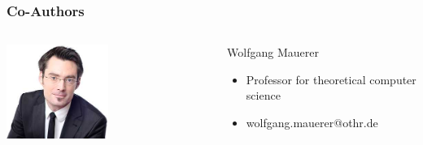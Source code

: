\documentclass{beamer}
\begin{document}
	\begin{frame}
	\frametitle{Co-Authors}
	\begin{minipage}[c]{1.0\linewidth}
		\begin{columns}
		\begin{column}{0.35\textwidth}
			\begin{center}
     		\includegraphics[width=0.5\textwidth]{pics/speakers_mauerer.jpeg}
			\end{center}
		\end{column}
		\begin{column}{0.7\textwidth}
		\begin{block}{Wolfgang Mauerer}
			\begin{itemize}
				\item Professor for theoretical computer science
				\item wolfgang.mauerer@othr.de
			\end{itemize}
		\end{block}
		\end{column}
		\end{columns}


\end{minipage}
\end{frame}
\end{document}
